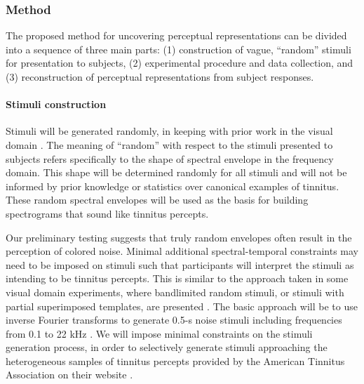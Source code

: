 \documentclass[11pt, notitlepage]{article} %
\begin{document}
\subsubsection*{Method}

The proposed method for uncovering perceptual representations can be divided
into a sequence of three main parts:
(1) construction of vague, ``random'' stimuli for presentation to subjects,
(2) experimental procedure and data collection,
and (3) reconstruction of perceptual representations from subject responses.


\paragraph{Stimuli construction}

Stimuli will be generated randomly, in keeping with prior work in the visual domain
\cite{gosselinSuperstitiousPerceptionsReveal2003}.
The meaning of ``random'' with respect to the stimuli presented to subjects
refers specifically to the shape of spectral envelope in the frequency domain.
This shape will be determined randomly for all stimuli
and will not be informed by prior knowledge
or statistics over canonical examples of tinnitus.
These random spectral envelopes will be used as the basis for building spectrograms
that sound like tinnitus percepts.

Our preliminary testing suggests that truly random envelopes
often result in the perception of colored noise.
Minimal additional spectral-temporal constraints may need to be imposed on stimuli
such that participants will interpret the stimuli as intending to be tinnitus percepts.
This is similar to the approach taken in some visual domain experiments,
where bandlimited random stimuli, or stimuli with partial superimposed templates,
are presented \cite{smithMeasuringInternalRepresentations2012}.
The basic approach will be to use inverse Fourier transforms to generate 0.5-s noise stimuli
including frequencies from 0.1 to 22 kHz \cite{brimijoinInternalRepresentationVowel2013}.
We will impose minimal constraints on the stimuli generation process,
in order to selectively generate stimuli approaching the heterogeneous samples of tinnitus percepts
provided by the American Tinnitus Association on their website \cite{Symptoms2015}.
\end{document}

